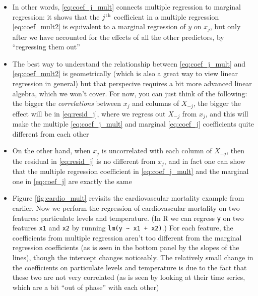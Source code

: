 \documentclass{article}
\begin{document}
\begin{itemize}
\item In other words, \eqref{eq:coef_j_mult} connects multiple regression to
  marginal regression: it shows that the $j^{\textnormal{th}}$ coefficient in a multiple
  regression \eqref{eq:coef_mult2} is equivalent to a marginal regression of $y$
  on $x_j$, but only after we have accounted for the effects of all the other
  predictors, by ``regressing them out'' 

\item The best way to understand the relationship between \eqref{eq:coef_j_mult}
  and \eqref{eq:coef_mult2} is geometrically (which is also a great way to view 
  linear regression in general) but that perspecive requires a bit more advanced
  linear algebra, which we won't cover. For now, you can just think of the
  following: the bigger the \emph{correlations} between $x_j$ and columns of
  $X_{-j}$, the bigger the effect will be in \eqref{eq:resid_j}, where we
  regress out $X_{-j}$ from $x_j$, and this will make the multiple
  \eqref{eq:coef_j_mult} and marginal \eqref{eq:coef_j} coefficients quite 
  different from each other

\item On the other hand, when $x_j$ is uncorrelated with each column of
  $X_{-j}$, then the residual  in \eqref{eq:resid_j} is
  no different from $x_j$, and in fact one can show that the multiple regression
  coefficient in \eqref{eq:coef_j_mult} and the marginal one in
  \eqref{eq:coef_j} are exactly the same

\item Figure \ref{fig:cardio_mult} revisits the cardiovascular mortality example
  from earlier. Now we perform the regression of cardiovascular mortality on two
  features: particulate levels and temperature. (In R we can regress \verb|y| on
  two features \verb|x1| and \verb|x2| by running \verb|lm(y ~ x1 + x2)|.) For
  each feature, the coefficients from multiple regression aren't too different
  from the marginal regression coefficients (as is seen in the bottom panel by
  the slopes of the lines), though the intercept changes noticeably. The 
  relatively small change in the coefficients on particulate levels and
  temperature is due to the fact that these two are not very correlated (as is
  seen by looking at their time series, which are a bit ``out of phase'' with
  each other) 
\end{itemize}
\end{document}
